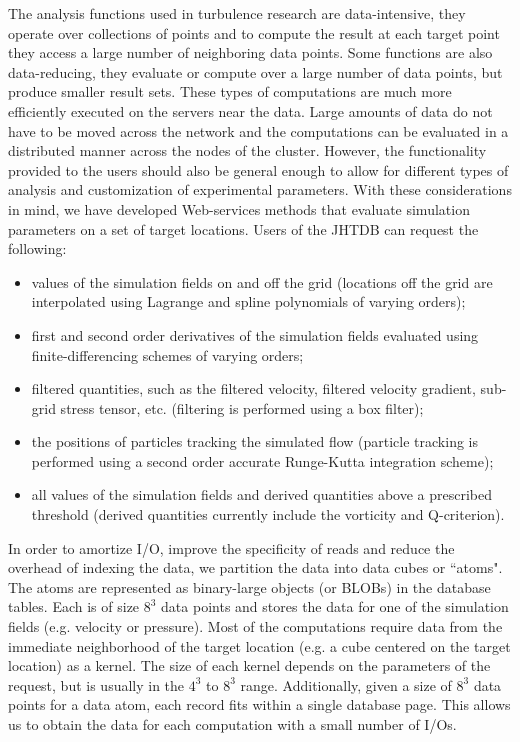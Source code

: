 \documentclass[10pt,twocolumn]{article}
\begin{document}
The analysis functions used in turbulence research are data-intensive, they operate over collections of points and to compute the result at each target point
they access a large number of neighboring data points. Some functions are also data-reducing, they evaluate or compute over a large number of data
points, but produce smaller result sets. These types of computations are much more efficiently executed on the servers near the data. Large amounts of data
do not have to be moved across the network and the computations can be evaluated in a distributed manner across the nodes of the cluster. However, the
functionality provided to the users should also be general enough to allow for different types of analysis and customization of experimental parameters.
With these considerations in mind, we have developed Web-services methods that evaluate simulation parameters on a set of target locations. Users of 
the JHTDB can request the following:
\begin{itemize}
\item values of the simulation fields on and off the grid (locations off the grid are interpolated using Lagrange and spline polynomials of varying orders);
\item first and second order derivatives of the simulation fields evaluated using finite-differencing schemes of varying orders;
\item filtered quantities, such as the filtered velocity, filtered velocity gradient, sub-grid stress tensor, etc. (filtering is performed using a box filter);
\item the positions of particles tracking the simulated flow (particle tracking is performed using a second order accurate Runge-Kutta integration scheme);
\item all values of the simulation fields and derived quantities above a prescribed threshold (derived quantities currently include the vorticity and Q-criterion).
\end{itemize}

In order to amortize I/O, improve the specificity of reads and reduce the overhead of indexing the data, we partition the data into data cubes or ``atoms".
The atoms are represented as binary-large objects (or BLOBs) in the database tables. Each is of size $8^3$ data points and stores the data for one of the
simulation fields (e.g. velocity or pressure). Most of the computations require data from the immediate neighborhood of the target location (e.g. a cube
centered on the target location) as a kernel. The size of each kernel depends on the parameters of the request, but is usually in the $4^3$ to $8^3$ range.
Additionally, given a size of $8^3$ data points for a data atom, each record fits within a single database page. This allows us to obtain the data for each
computation with a small number of I/Os.
\end{document}
